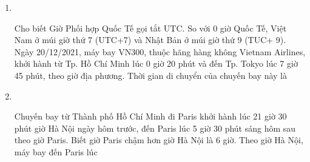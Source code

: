 \begin{enumerate}[label=\bfseries Câu \arabic*:]
\item {}\\
{Cho biết Giờ Phối hợp Quốc Tế gọi tắt UTC. So với 0 giờ Quốc Tế, Việt Nam ở múi giờ thứ 7 (UTC+7) và Nhật Bản ở múi giờ thứ 9 (TUC+ 9). Ngày 20/12/2021, máy bay VN300, thuộc hãng hàng không Vietnam Airlines, khởi hành từ Tp. Hồ Chí Minh lúc 0 giờ 20 phút và đến Tp. Tokyo lúc 7 giờ 45 phút, theo giờ địa phương. Thời gian di chuyển của chuyến bay này là
}
\item {}\\
{Chuyến bay từ Thành phố Hồ Chí Minh đi Paris khởi hành lúc 21 giờ 30 phút giờ Hà Nội ngày hôm trước, đến Paris lúc 5 giờ 30 phút sáng hôm sau theo giờ Paris. Biết giờ Paris chậm hơn giờ Hà Nội là 6 giờ. Theo giờ Hà Nội, máy bay đến Paris lúc
}

\end{enumerate}
